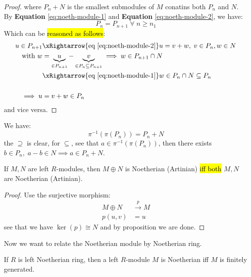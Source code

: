 \begin{proof}
	where \( P_n + N \) is the smallest submodules of \( M \) conatins both \( P_n \) and \( N \). By
	\textbf{Equation} \ref{eq:noeth-module-1} and \textbf{Equation} \ref{eq:noeth-module-2}, we have:
	\[
		P_n = P_{n+1} \; \forall \; n \geq n_1
	\]
	Which can be \hl{reasoned as follows}:
	\[
		\begin{aligned}
			u \in P_{n+1}  & \xRightarrow{\text{eq } \ref{eq:noeth-module-2}} u = v+w, \; v\in P_n,
			w\in N
			\\
			\text{with } w & = \underbrace{u}_{\in P_{n+1}} - \underbrace{v}_{\in P_n \subseteq P_{n+1}}
			\implies w \in P_{n+1} \cap N                                                                \\
			               & \xRightarrow{\text{eq } \ref{eq:noeth-module-1}} w \in P_n \cap N \subseteq
			P_n                                                                                          \\                                                                         \\
			\implies u     & = v+w \in P_n
		\end{aligned}
	\]
	and vice versa.
\end{proof}


\begin{note}
	We have:
	\[
		\pi^{-1}(\pi (P_n)) = P_n + N
	\]
	the \( \supseteq \) is clear, for \( \subseteq \), see that \( a \in \pi^{-1}(\pi(P_n)) \), then
	there exists \( b \in P_n, \; a-b \in N \implies a \in P_n + N \).
\end{note}

\begin{corollary}
	\label{cor:noeth-module-1}
	If \( M,N \) are left \( R \)-modules, then \( M\oplus N \) is Noetherian (Artinian) \hl{iff both} \(
	M, N \) are Noetherian (Artinian).
\end{corollary}

\begin{proof}
	Use the surjective morphism:
	\[
		\begin{aligned}
			M \oplus N & \xrightarrow{p} M \\
			p(u,v)     & = u
		\end{aligned}
	\]
	see that we have \( \ker(p) \cong N \) and by proposition we are done.
\end{proof}
Now we want to relate the Noetherian module by Noetherian ring.

\begin{corollary}
	If \( R \) is left Noetherian ring, then a left \( R \)-module \( M \) is Noetherian iff \( M \)
	is finitely generated.
\end{corollary}

